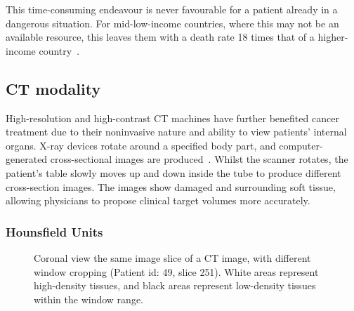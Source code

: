 \documentclass[12pt,twoside]{report}
\begin{document}
This time-consuming endeavour is never favourable for a patient already in a dangerous situation. For mid-low-income countries, where this may not be an available resource, this leaves them with a death rate 18 times that of a higher-income country~\cite{cervical-cancer-epidemic}. 

\subsection{CT modality}\label{sect:ct-modality}

High-resolution and high-contrast CT machines have further benefited cancer treatment due to their noninvasive nature and ability to view patients' internal organs. X-ray devices rotate around a specified body part, and computer-generated cross-sectional images are produced~\cite{file-formats}. Whilst the scanner rotates, the patient's table slowly moves up and down inside the tube to produce different cross-section images. The images show damaged and surrounding soft tissue, allowing physicians to propose clinical target volumes more accurately.

\subsubsection{Hounsfield Units}

\begin{figure}[H]
    \centering
    \caption{Coronal view the same image slice of a CT image, with different window cropping (Patient id: 49, slice 251). White areas represent high-density tissues, and black areas represent low-density tissues within the window range.}\label{fig:ct-windows}
\end{figure}
\end{document}
